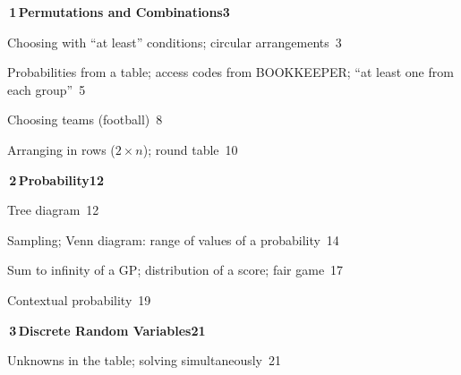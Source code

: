 {\small\linespread{0.92}\selectfont
\medskip\noindent\colorbox{blue!8}{\parbox{\dimexpr\textwidth-2\fboxsep}{\large\bfseries\color{blue!50!black}\colorbox{blue!50!black}{\color{white}\,1\,}\quad Permutations and Combinations\hfill 3}}\par\nopagebreak\smallskip\nopagebreak
\noindent{}\quad Choosing with ``at least'' conditions; circular arrangements\dotfill\ 3\par
\noindent{}\quad Probabilities from a table; access codes from BOOKKEEPER; ``at least one from each group''\dotfill\ 5\par
\noindent{}\quad Choosing teams (football)\dotfill\ 8\par
\noindent{}\quad Arranging in rows ($2\times n$); round table\dotfill\ 10\par
\medskip\noindent\colorbox{blue!8}{\parbox{\dimexpr\textwidth-2\fboxsep}{\large\bfseries\color{blue!50!black}\colorbox{blue!50!black}{\color{white}\,2\,}\quad Probability\hfill 12}}\par\nopagebreak\smallskip\nopagebreak
\noindent{}\quad Tree diagram\dotfill\ 12\par
\noindent{}\quad Sampling; Venn diagram: range of values of a probability\dotfill\ 14\par
\noindent{}\quad Sum to infinity of a GP; distribution of a score; fair game\dotfill\ 17\par
\noindent{}\quad Contextual probability\dotfill\ 19\par
\medskip\noindent\colorbox{blue!8}{\parbox{\dimexpr\textwidth-2\fboxsep}{\large\bfseries\color{blue!50!black}\colorbox{blue!50!black}{\color{white}\,3\,}\quad Discrete Random Variables\hfill 21}}\par\nopagebreak\smallskip\nopagebreak
\noindent{}\quad Unknowns in the table; solving simultaneously\dotfill\ 21\par
}
